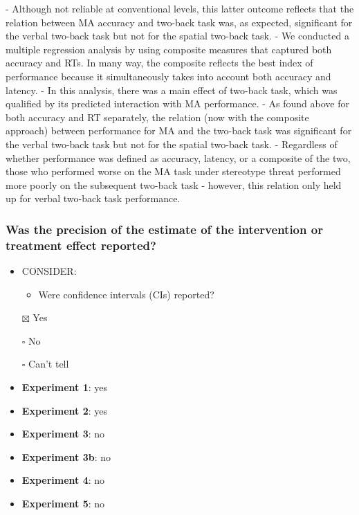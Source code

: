 \documentclass[
  doc, a4paper]{apa7}
\providecommand{\tightlist}{%
  \setlength{\itemsep}{0pt}\setlength{\parskip}{0pt}}
\begin{document}
- Although not reliable at conventional levels, this latter outcome reflects that the relation between MA accuracy and two-back task was, as expected, significant for the verbal two-back task but not for the spatial two-back task.
- We conducted a multiple regression analysis by using composite measures that captured both accuracy and RTs. In many way, the composite reflects the best index of performance because it simultaneously takes into account both accuracy and latency.
- In this analysis, there was a main effect of two-back task, which was qualified by its predicted interaction with MA performance.
- As found above for both accuracy and RT separately, the relation (now with the composite approach) between performance for MA and the two-back task was significant for the verbal two-back task but not for the spatial two-back task.
- Regardless of whether performance was defined as accuracy, latency, or a composite of the two, those who performed worse on the MA task under stereotype threat performed more poorly on the subsequent two-back task - however, this relation only held up for verbal two-back task performance.

\subsubsection{Was the precision of the estimate of the intervention or treatment effect reported?}\label{was-the-precision-of-the-estimate-of-the-intervention-or-treatment-effect-reported}

\begin{itemize}
\item
  CONSIDER:

  \begin{itemize}
  \tightlist
  \item
    Were confidence intervals (CIs) reported?
  \end{itemize}
\item[$\boxtimes$]
  Yes
\item[$\square$]
  No
\item[$\square$]
  Can't tell
\item
  \textbf{Experiment 1}: yes\\
\item
  \textbf{Experiment 2}: yes
\item
  \textbf{Experiment 3}: no
\item
  \textbf{Experiment 3b}: no
\item
  \textbf{Experiment 4}: no
\item
  \textbf{Experiment 5}: no
\end{itemize}
\end{document}
